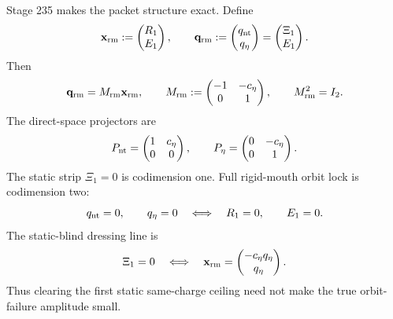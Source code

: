 Stage 235 makes the packet structure exact.  Define
\begin{equation}
\label{eq:part07-rigid-mouth-direct-vector}
\mathbf x_{\rm rm}:=\begin{pmatrix}R_1\\E_1\end{pmatrix},
\qquad
\mathbf q_{\rm rm}:=\begin{pmatrix}q_{\rm nt}\\q_\eta\end{pmatrix}
=\begin{pmatrix}\Xi_1\\E_1\end{pmatrix}.
\end{equation}
Then
\begin{equation}
\label{eq:part07-mrm}
\mathbf q_{\rm rm}=M_{\rm rm}\mathbf x_{\rm rm},
\qquad
M_{\rm rm}:=\begin{pmatrix}-1&-c_\eta\\0&1\end{pmatrix},
\qquad
M_{\rm rm}^2=I_2.
\end{equation}
The direct-space projectors are
\begin{equation}
\label{eq:part07-direct-projectors}
P_{\rm nt}=\begin{pmatrix}1&c_\eta\\0&0\end{pmatrix},
\qquad
P_\eta=\begin{pmatrix}0&-c_\eta\\0&1\end{pmatrix}.
\end{equation}
The static strip \(\Xi_1=0\) is codimension one.  Full rigid-mouth orbit lock is codimension two:
\begin{equation}
\label{eq:part07-rm-codim-two}
q_{\rm nt}=0,
\qquad
q_\eta=0
\quad\Longleftrightarrow\quad
R_1=0,
\qquad
E_1=0.
\end{equation}
The static-blind dressing line is
\begin{equation}
\label{eq:part07-static-blind-line}
\Xi_1=0
\quad\Longleftrightarrow\quad
\mathbf x_{\rm rm}=\begin{pmatrix}-c_\eta q_\eta\\q_\eta\end{pmatrix}.
\end{equation}
Thus clearing the first static same-charge ceiling need not make the true orbit-failure amplitude small.

